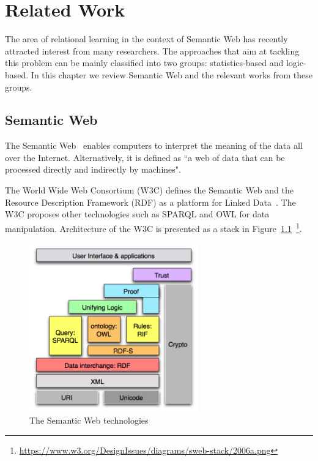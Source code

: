 \chapter{Related Work}
\label{chap:relwork}

The area of relational learning in the context of Semantic Web has recently attracted interest from many researchers. The approaches that aim at tackling this problem can be mainly classified into two groups: statistics-based and logic-based. In this chapter we review Semantic Web and the relevant works from these groups.

\section{Semantic Web}

The Semantic Web~\cite{ref26} enables computers to interpret the meaning of the data all over the Internet. Alternatively, it is defined as ``a web of data that can be processed directly and indirectly by machines".

The World Wide Web Consortium (W3C) defines the Semantic Web and the Resource Description Framework (RDF) as a platform for Linked Data~\cite{ref26}. The W3C proposes other technologies such as SPARQL and OWL for data manipulation. Architecture of the W3C is presented as a stack in Figure~\ref{fig1}~\footnote{\url{https://www.w3.org/DesignIssues/diagrams/sweb-stack/2006a.png}}.

\begin{figure}
\centering
\includegraphics[width=0.65\textwidth]{figures/semantic_web.png}
\caption{The Semantic Web technologies}
\label{fig1}
\end{figure}

